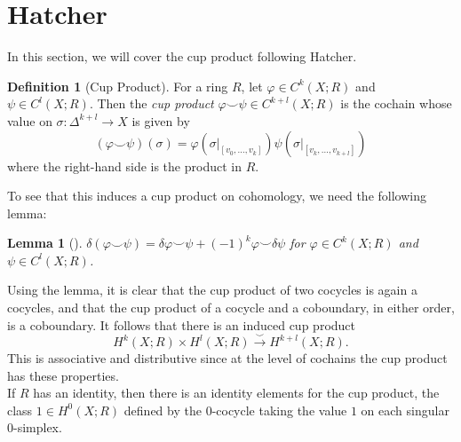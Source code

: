 \documentclass[reqno]{amsart}
\newtheorem{lemma}[theorem]{Lemma}
\theoremstyle{definition}
\newtheorem{definition}[theorem]{Definition}
\theoremstyle{remark}
\begin{document}
\section{Hatcher}
    In this section, we will cover the cup product following Hatcher.\\

    \begin{definition}[Cup Product]
        For a ring $R$, let
        $\varphi \in C^{k}(X;R)$ and
        $\psi \in C^{l}(X;R)$. Then
        the \textit{cup product}
        $\varphi \smile \psi \in C^{k+l}(X;R)$ is the cochain
        whose value
        on $\sigma \colon \Delta^{k+l} \to X$ is given
        by
        \[
            \left( \varphi \smile \psi  \right) (\sigma)
            = \varphi \left( \sigma |_{\left[ v_0,\ldots,
            v_k \right] } \right) 
            \psi \left( \sigma|_{\left[ v_k,\ldots,
            v_{k+l} \right] } \right) 
        \] 
        where the right-hand side is the product
        in $R$.
    \end{definition}

    To see that this induces a
    cup product on cohomology, we
    need the following lemma:

    \begin{lemma}[]
        $\delta \left( \varphi \smile
        \psi \right) = 
        \delta \varphi \smile \psi +
        (-1)^{k} \varphi \smile \delta \psi $ 
        for $\varphi \in C^{k}(X;R)$ and
        $\psi \in C^{l}(X;R)$.
    \end{lemma}

    Using the lemma, it is clear
    that the cup product
    of two cocycles is again a cocycles, and
    that the cup product of a
    cocycle and a coboundary, in either order,
    is a coboundary.
    It follows that there is an induced cup product
    \[
    H^{k}(X;R) \times H^{l}(X;R)
    \stackrel{\smile}{\to} H^{k+l}(X;R).
    \] 
    This is associative and distributive since at the level
    of cochains the cup product has these properties.\\
    If $R$ has an identity, then there is an identity
    elements for the cup product, the class
    $1 \in H^{0}(X;R)$ defined by the
    $0$-cocycle taking the value $1$ on each singular
    $0$-simplex.
\end{document}
